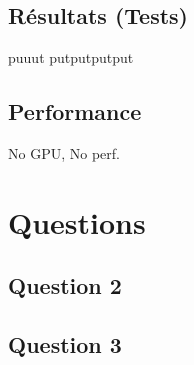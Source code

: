 \documentclass[paper=a4, fontsize=11pt]{scrartcl} %
\numberwithin{equation}{section} %
\numberwithin{figure}{section} %
\numberwithin{table}{section} %
\begin{document}
\subsection{Résultats (Tests)}
puuut putputputput


\subsection{Performance}
No GPU, No perf.

\section{Questions}

\subsection{Question 2}
\subsection{Question 3}
\end{document}
